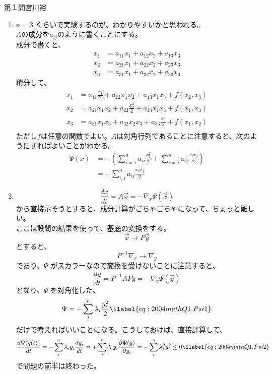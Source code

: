 \documentclass[fleqn]{jbook}
\begin{document}
\begin{answer}{第１問}{宮川裕}
\begin{enumerate}
\item
  $n=3$ くらいで実験するのが、わかりやすいかと思われる。\\
  $A$の成分を$a_{ij}$のように書くことにする。\\
  成分で書くと、
  \begin{align*}
    x_1&= a_{11} x_1 + a_{12} x_2 + a_{13} x_3 \\
    x_2&= a_{21} x_1 + a_{22} x_2 + a_{23} x_3 \\
    x_3&= a_{31} x_1 + a_{32} x_2 + a_{33} x_3 
  \end{align*}
  積分して、
  \begin{align*}
    x_1&= a_{11} \frac{x_1^2}{2} + a_{12} x_1 x_2 + a_{13} x_1 x_3 + f(x_2,x_3) \\
    x_2&= a_{21} x_1 x_2 + a_{22} \frac{x_2^2}{2} + a_{23} x_1 x_3 + f(x_1,x_3) \\
    x_3&= a_{31} x_1 x_3 + a_{32} x_2 x_3 + a_{33} \frac{x_3^2}{2} + f(x_1,x_2) \\
  \end{align*}
  ただし$f$は任意の関数でよい。$A$は対角行列であることに注意すると、次のようにすればよいことがわかる。
  \begin{align*}
    \Psi(x)
      &= -\left( \sum_{i=1}^{n} a_{ii}\frac{x_i^2}{2} + \sum_{i\neq j}^{n}a_{ij}\frac{x_i x_j}{2}\right) \\
      &= -\sum_{i,j}^{n} a_{ij}\frac{x_i x_j}{2}
  \end{align*}

\item
  \[
    \frac{dx}{dt}= A\vec{x}= -\nabla _x \Psi(\vec{x})
  \]
  から直接示そうとすると、成分計算がごちゃごちゃになって、ちょっと難しい。\\
  ここは設問の結果を使って、基底の変換をする。
  \[
    \vec{x}\to P\vec{y}
  \]
  とすると、
  \[
    P^{-1} \nabla_x \to \nabla_y
  \]
  であり、$\Psi$ がスカラーなので変換を受けないことに注意すると、
  \[
    \frac{dy}{dt}= P^{-1}A P y = -\nabla_y \Psi(\vec{y})
  \]
  となり、$\Psi$ を対角化した、
  \begin{equation}
    \Psi = -\sum_{i}^{n} \lambda _i \frac{y_i^2}{2} \ilabel{eq:2004mathQ1.Psi1}
  \end{equation}
  だけで考えればいいことになる。こうしておけば、直接計算して、
  \begin{equation}
    \frac{d\Psi(y(t))}{dt}= -\sum_{i}^{n}  \lambda _i y_i \frac{dy_i}{dt}\\
    = + \sum_{i}^{n} \lambda _i y_i \frac{\partial \Psi(y)}{\partial y_i}\\
    =- \sum_{i}^{n} \lambda _i^2 y_i^2  \le 0  \ilabel{eq:2004mathQ1.Psi2}
  \end{equation}
  で問題の前半は終わった。\\


\end{enumerate}
\end{answer}
\end{document}
